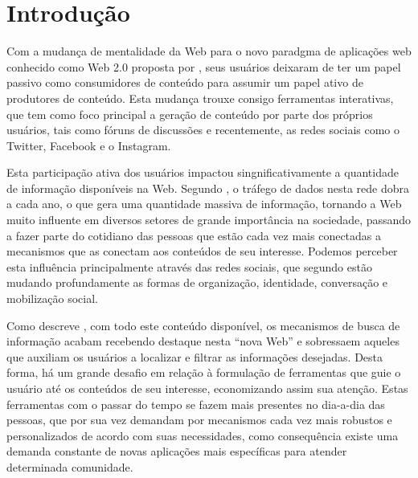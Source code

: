 \section{\esp Introdução}
Com a mudança de mentalidade da Web para o novo paradgma de aplicações web conhecido como Web 2.0 proposta por \cite{web20Proposta}, seus 
usuários deixaram de ter um papel passivo como consumidores de conteúdo para assumir um papel ativo de produtores de conteúdo. Esta mudança 
trouxe consigo ferramentas interativas, que tem como foco principal a geração de conteúdo por parte dos próprios usuários, tais como fóruns 
de discussões e recentemente, as redes sociais como o Twitter, Facebook e o Instagram.

Esta participação ativa dos usuários impactou singnificativamente a quantidade de informação disponíveis na Web. Segundo \cite{artigo01}, 
o tráfego de dados nesta rede dobra a cada ano, o que gera uma quantidade massiva de informação, tornando a Web muito influente em diversos 
setores de grande importância na sociedade, passando a fazer parte do cotidiano das pessoas que estão cada vez mais conectadas a mecanismos que
as  conectam aos conteúdos de seu interesse. Podemos perceber esta influência principalmente através das redes sociais, que segundo 
\cite{redesSociais01} estão mudando profundamente as formas de organização, identidade, conversação e mobilização social.

Como descreve \cite{deitelAjax}, com todo este conteúdo disponível, os mecanismos de busca de informação 
acabam recebendo destaque nesta ``nova Web'' e sobressaem aqueles que auxiliam os usuários  a localizar e filtrar 
as informações desejadas. Desta forma, há um grande desafio em relação à formulação de ferramentas que guie o usuário até os conteúdos de seu 
interesse, economizando assim sua atenção. Estas ferramentas com o passar do tempo se fazem mais presentes no dia-a-dia das pessoas, 
que por sua vez demandam por mecanismos cada vez mais robustos e personalizados de acordo com suas necessidades, como consequência existe 
uma demanda constante de novas aplicações mais específicas para atender determinada comunidade.

